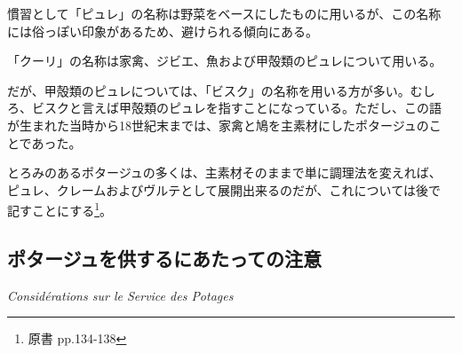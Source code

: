 慣習として「ピュレ」の名称は野菜をベースにしたものに用いるが、この名称
には俗っぽい印象があるため、避けられる傾向にある。

「クーリ」の名称は家禽、ジビエ、魚および甲殻類のピュレについて用いる。

だが、甲殻類のピュレについては、「ビスク」の名称を用いる方が多い。むし
ろ、ビスクと言えば甲殻類のピュレを指すことになっている。ただし、この語
が生まれた当時から18世紀末までは、家禽と鳩を主素材にしたポタージュのこ
とであった。

とろみのあるポタージュの多くは、主素材そのままで単に調理法を変えれば、
ピュレ、クレームおよびヴルテとして展開出来るのだが、これについては後で
記すことにする\footnote{原書 pp.134-138}。

\hypertarget{consideration-sur-le-service-des-potages}{%
\subsection{ポタージュを供するにあたっての注意}\label{consideration-sur-le-service-des-potages}}

\vspace{-1\zw} \begin{center}
\hspace{1\zw}\large\textit{Considérations sur le Service des Potages}
\normalsize \end{center}
